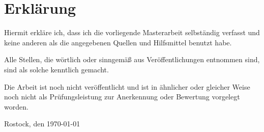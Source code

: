 \chapter*{Erklärung}
Hiermit erkläre ich, dass ich die vorliegende Masterarbeit selbständig verfasst und keine anderen als die angegebenen Quellen und Hilfsmittel benutzt habe.

Alle Stellen, die wörtlich oder sinngemäß aus Veröffentlichungen entnommen sind, sind als solche kenntlich gemacht.

Die Arbeit ist noch nicht veröffentlicht und ist in ähnlicher oder gleicher Weise noch nicht als Prüfungsleistung zur Anerkennung oder Bewertung vorgelegt worden.

Rostock, den \today
\\
 \\
\\
 \\
\\
